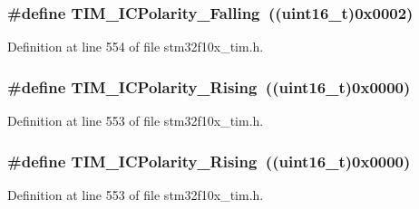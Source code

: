 \subsubsection[{\texorpdfstring{T\+I\+M\+\_\+\+I\+C\+Polarity\+\_\+\+Falling}{TIM_ICPolarity_Falling}}]{\setlength{\rightskip}{0pt plus 5cm}\#define T\+I\+M\+\_\+\+I\+C\+Polarity\+\_\+\+Falling~(({\bf uint16\+\_\+t})0x0002)}\hypertarget{group___t_i_m___input___capture___polarity_ga70c6f5ed30a236bac4c690928e742243}{}\label{group___t_i_m___input___capture___polarity_ga70c6f5ed30a236bac4c690928e742243}


Definition at line 554 of file stm32f10x\+\_\+tim.\+h.

\subsubsection[{\texorpdfstring{T\+I\+M\+\_\+\+I\+C\+Polarity\+\_\+\+Rising}{TIM_ICPolarity_Rising}}]{\setlength{\rightskip}{0pt plus 5cm}\#define T\+I\+M\+\_\+\+I\+C\+Polarity\+\_\+\+Rising~(({\bf uint16\+\_\+t})0x0000)}\hypertarget{group___t_i_m___input___capture___polarity_gabe598596b7dbcac446a4918105fa95a6}{}\label{group___t_i_m___input___capture___polarity_gabe598596b7dbcac446a4918105fa95a6}


Definition at line 553 of file stm32f10x\+\_\+tim.\+h.

\subsubsection[{\texorpdfstring{T\+I\+M\+\_\+\+I\+C\+Polarity\+\_\+\+Rising}{TIM_ICPolarity_Rising}}]{\setlength{\rightskip}{0pt plus 5cm}\#define T\+I\+M\+\_\+\+I\+C\+Polarity\+\_\+\+Rising~(({\bf uint16\+\_\+t})0x0000)}\hypertarget{group___t_i_m___input___capture___polarity_gabe598596b7dbcac446a4918105fa95a6}{}\label{group___t_i_m___input___capture___polarity_gabe598596b7dbcac446a4918105fa95a6}


Definition at line 553 of file stm32f10x\+\_\+tim.\+h.

